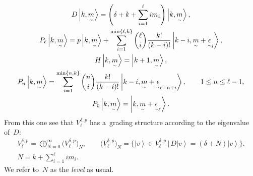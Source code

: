 \documentclass[11pt]{article}
\numberwithin{equation}{section}
\newcommand{\underaccent}[2]{\mathord{\underset{\smash{\scriptscriptstyle\sim}}{#2}}}
\def\ket#1{\left| #1\right\rangle}
\begin{document}
\begin{gather*}
    D \ket{k,\underaccent{\tilde}{m}} = \left(\delta + k+ \sum\limits_{i=1}^{\ell} i   m_i\right) \ket{k,\underaccent{\tilde}{m}},
\nonumber
\\
    P_{\ell} \ket{k,\underaccent{\tilde}{m}} = p \ket{k,\underaccent{\tilde}{m}} + \sum\limits_{i=1}^{\min\{\ell,k\}}
\binom{\ell}{i} \frac{k!}{(k-i)!} \ket{k-i,\underaccent{\tilde}{m}+\underaccent{\tilde}{\epsilon}_{i}},
\nonumber
\\
    H \ket{k,\underaccent{\tilde}{m}}= \ket{k+1,\underaccent{\tilde}{m}},
\nonumber
\\
    P_n \ket{k,\underaccent{\tilde}{m}} = \sum\limits_{i=1}^{\min\{n,k\}} \binom{n}{i} \frac{k!}{(k-i)!}
\ket{k-i,\underaccent{\tilde}{m}+\underaccent{\tilde}{\epsilon}_{\ell-n+i}},
\qquad
1 \leq n \leq \ell-1,
\nonumber
\\
    P_0 \ket{k,\underaccent{\tilde}{m}} = \ket{k,\underaccent{\tilde}{m}+\underaccent{\tilde}{\epsilon}_{\ell}}.
\end{gather*}
From this one see that $ V^{\delta,p}_{\ell} $ has a~grading structure according to the eigenvalue of~$D$:
\begin{gather*}
    V^{\delta,p}_{\ell} = \bigoplus_{N=0}^{\infty} \big(V^{\delta,p}_{\ell}\big)_N,
\qquad
\big(V^{\delta,p}_{\ell}\big)_N = \big\{ \ket{v} \in V^{\delta,p}_{\ell} \, | \, D \ket{v} = (\delta+N) \ket{v} \big\}.
\\
    N = k+ \sum\limits_{i=1}^{\ell} i   m_i.
\end{gather*}
We refer to~$N$ as the \textit{level} as usual.
\end{document}
